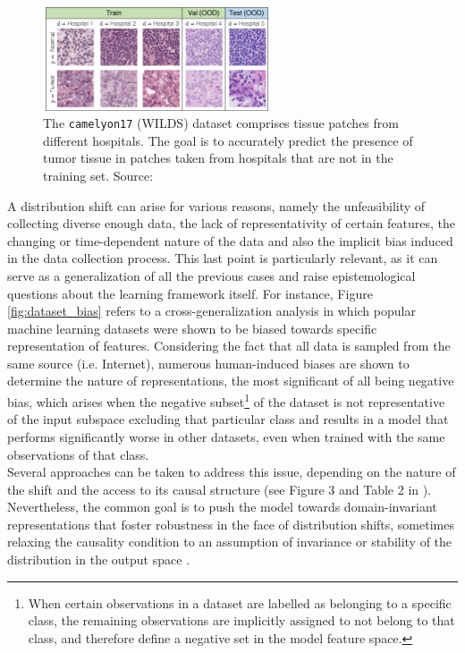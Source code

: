 \begin{figure}[H]
    \centering
    \includegraphics[width=0.6\textwidth]{img/introduction/camelyon17.png}
    \caption{The \texttt{camelyon17} (WILDS) dataset comprises tissue patches from 
    different hospitals. The goal is to accurately predict the presence of 
    tumor tissue in patches taken from hospitals that are not in the 
    training set.
    Source: \cite{kohWILDSBenchmarkIntheWild2021}
    }
    \label{fig:camelyon17}
\end{figure}

A distribution shift can arise for various reasons, namely the 
unfeasibility of collecting diverse enough data, the lack of 
representativity of certain features, the changing or time-dependent
nature of the data and also the implicit bias
induced in the data collection process. This last point
is particularly relevant, as it can serve as a generalization of all
the previous cases and raise epistemological questions
about the learning framework itself. For instance, 
Figure \ref{fig:dataset_bias} refers to a cross-generalization analysis in which popular
machine learning datasets were shown to be biased towards
specific representation of features. Considering the fact that all
data is sampled from the same source (i.e. Internet), 
numerous human-induced biases are shown to determine the 
nature of representations, the most significant of all being 
negative bias, which arises when the negative subset\footnote{
    When certain observations in a dataset are labelled as belonging 
    to a specific class, the remaining observations are implicitly
    assigned to not belong to that class, and therefore define a
    negative set in the model feature space.
}
of the dataset is not representative of the input subspace 
excluding that  particular class and results in a model that performs 
significantly worse in other datasets, even when trained with 
the same observations of that class.\\

Several approaches can be taken to address this issue, depending
on the nature of the shift and the access to its
causal structure (see Figure 3 and Table 2 in 
\cite{wangGeneralizingUnseenDomains2022}).
Nevertheless, the common goal is to push the model towards
domain-invariant representations that foster robustness in the
face of distribution shifts, sometimes relaxing the causality condition
to an assumption of invariance or stability of the distribution in the output space
\cite{wangGeneralizingUnseenDomains2022,liuOutOfDistributionGeneralizationSurvey2023}. \\

